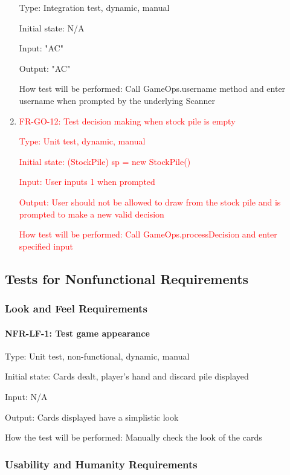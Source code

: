 \documentclass[12pt, titlepage]{article}
\begin{document}
\begin{enumerate}
    Type: Integration test, dynamic, manual
    
    Initial state: N/A
    
    Input: "AC"
    
    Output: "AC"
    
    How test will be performed: Call GameOps.username method and enter username when prompted by the underlying Scanner
    
    \item{\textcolor{red}{FR-GO-12: Test decision making when stock pile is empty}}
    
    \textcolor{red}{Type: Unit test, dynamic, manual}
    
    \textcolor{red}{Initial state: (StockPile) sp = new StockPile()}
    
    \textcolor{red}{Input: User inputs 1 when prompted}
    
    \textcolor{red}{Output: User should not be allowed to draw from the stock pile and is prompted to make a new valid decision}
    
    \textcolor{red}{How test will be performed: Call GameOps.processDecision and enter specified input}
\end{enumerate}

\subsection{Tests for Nonfunctional Requirements}

\subsubsection{Look and Feel Requirements}

\paragraph{NFR-LF-1: Test game appearance\\}

Type: Unit test, non-functional, dynamic, manual

Initial state: Cards dealt, player's hand and discard pile displayed

Input: N/A

Output: Cards displayed have a simplistic look

How the test will be performed: Manually check the look of the cards

\subsubsection{Usability and Humanity Requirements}
\end{document}
